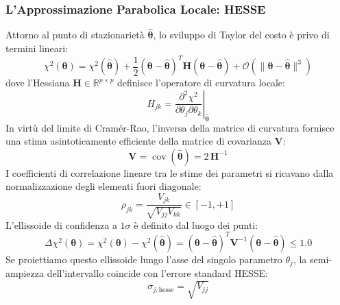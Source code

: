 \documentclass[11pt,a4paper]{article}
\begin{document}
\subsubsection{L'Approssimazione Parabolica Locale: HESSE}
Attorno al punto di stazionarietà $\hat{\boldsymbol{\theta}}$, lo sviluppo di Taylor del costo è privo di termini lineari:
\begin{equation}
    \chi^2(\boldsymbol{\theta}) = \chi^2(\hat{\boldsymbol{\theta}}) + \frac{1}{2} (\boldsymbol{\theta} - \hat{\boldsymbol{\theta}})^T \mathbf{H} (\boldsymbol{\theta} - \hat{\boldsymbol{\theta}}) + \mathcal{O}(\|\boldsymbol{\theta} - \hat{\boldsymbol{\theta}}\|^3)
\end{equation}
dove l'Hessiana $\mathbf{H} \in \mathbb{R}^{p \times p}$ definisce l'operatore di curvatura locale:
\begin{equation}
    H_{jk} = \left. \frac{\partial^2 \chi^2}{\partial \theta_j \partial \theta_k} \right|_{\hat{\boldsymbol{\theta}}}
\end{equation}
In virtù del limite di Cramér-Rao, l'inversa della matrice di curvatura fornisce una stima asintoticamente efficiente della matrice di covarianza $\mathbf{V}$:
\begin{equation}
    \mathbf{V} = \operatorname{cov}(\hat{\boldsymbol{\theta}}) = 2 \, \mathbf{H}^{-1}
\end{equation}
I coefficienti di correlazione lineare tra le stime dei parametri si ricavano dalla normalizzazione degli elementi fuori diagonale:
\begin{equation}
    \rho_{jk} = \frac{V_{jk}}{\sqrt{V_{jj} V_{kk}}} \in [-1, +1]
\end{equation}
L'ellissoide di confidenza a $1\sigma$ è definito dal luogo dei punti:
\begin{equation}
    \Delta \chi^2(\boldsymbol{\theta}) = \chi^2(\boldsymbol{\theta}) - \chi^2(\hat{\boldsymbol{\theta}}) = (\boldsymbol{\theta} - \hat{\boldsymbol{\theta}})^T \mathbf{V}^{-1} (\boldsymbol{\theta} - \hat{\boldsymbol{\theta}}) \le 1.0
\end{equation}
Se proiettiamo questo ellissoide lungo l'asse del singolo parametro $\theta_j$, la semi-ampiezza dell'intervallo coincide con l'errore standard HESSE:
\begin{equation}
    \sigma_{j, \text{hesse}} = \sqrt{V_{jj}}
\end{equation}
\end{document}

